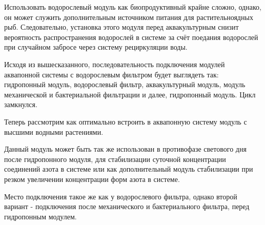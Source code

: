 Использовать водорослевый модуль как биопродуктивный крайне сложно, однако, он может служить дополнительным источником питания для растительноядных рыб. Следовательно, установка этого модуля перед аквакультурным снизит вероятность распространения водорослей в системе за счёт поедания водорослей при случайном забросе через систему рециркуляции воды.

Исходя из вышесказанного, последовательность подключения модулей аквапонной системы с водорослевым фильтром будет выглядеть так: гидропонный модуль, водорослевый фильтр, аквакультурный модуль, модуль механической и бактериальной фильтрации и далее, гидропонный модуль. Цикл замкнулся.

Теперь рассмотрим как оптимально встроить в аквапонную систему модуль с высшими водными растениями.

Данный модуль может быть так же использован в противофазе светового дня после гидропонного модуля, для стабилизации суточной концентрации соединений азота в системе или как дополнительный модуль стабилизации при резком увеличении концентрации форм азота в системе. 

Место подключения такое же как у водорослевого фильтра, однако второй вариант - подключения после механического и бактериального фильтра, перед гидропонным модулем.

